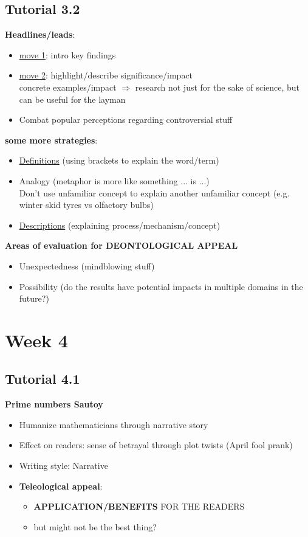 \documentclass{article}
\begin{document}
\begin{multicols}{2}
\subsection{Tutorial 3.2}
\textbf{Headlines/leads}:
\begin{itemize}
	\item \underline{move 1}: intro key findings
	\item \underline{move 2}: highlight/describe significance/impact\\
	concrete examples/impact $\Rightarrow$ research not just for the sake of science, but can be useful for the layman
	\item Combat popular perceptions regarding controversial stuff
\end{itemize}
\textbf{some more strategies}:
\begin{itemize}
	\item \underline{Definitions} (using brackets to explain the word/term)
	\item Analogy (metaphor is more like something ... is ...)\\
	Don't use unfamiliar concept to explain another unfamiliar concept (e.g. winter skid tyres vs olfactory bulbs)
	\item \underline{Descriptions} (explaining process/mechanism/concept)
\end{itemize}
\textbf{Areas of evaluation for DEONTOLOGICAL APPEAL}
\begin{itemize}
	\item Unexpectedness (mindblowing stuff)
	\item Possibility (do the results have potential impacts in multiple domains in the future?)
\end{itemize}
\section{Week 4}
\subsection{Tutorial 4.1}
\textbf{Prime numbers Sautoy}
\begin{itemize}
	\item Humanize mathematicians through narrative story
	\item Effect on readers: sense of betrayal through plot twists (April fool prank)
	\item Writing style: Narrative
	\item \textbf{Teleological appeal}:
	\begin{itemize}
		\item \textbf{APPLICATION/BENEFITS} FOR THE READERS
		\item but might not be the best thing?
	\end{itemize}
\end{itemize}

\end{multicols}
\end{document}
